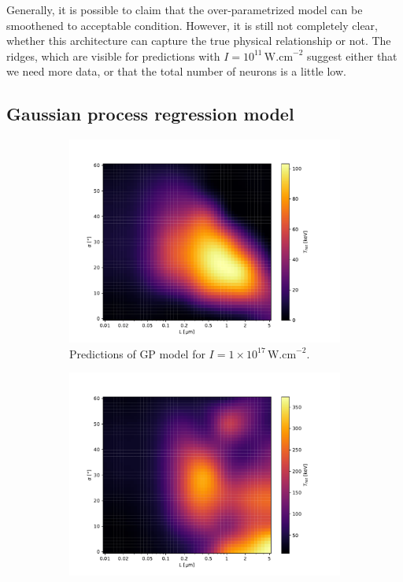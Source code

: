 Generally, it is possible to claim that the over-parametrized model can be smoothened to acceptable condition. However, it is still not completely clear, whether this architecture can capture the true physical relationship or not. The ridges, which are visible for predictions with $I = 10^{11} \, \mathrm{W.cm}^{-2}$ suggest either that we need more data, or that the total number of neurons is a little low.


\subsection*{Gaussian process regression model}
\begin{figure}[ht]
	\centering
	\begin{subfigure}{0.49\textwidth}
		\centering
		\includegraphics[width=\textwidth]{figures/gp17_pred}
		\caption{Predictions of GP model for $I = 1 \times 10^{17} \, \mathrm{W.cm}^{-2}$.}
		\label{fig:gp-pred-a}
	\end{subfigure}
	\hfill
	\begin{subfigure}{0.49\textwidth}
		\centering
		\includegraphics[width=\textwidth]{figures/gp18_pred}

\end{subfigure}
\end{figure}
